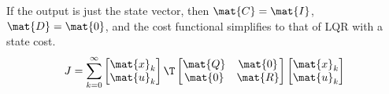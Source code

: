 If the output is just the state vector, then $\mat{C} = \mat{I}$,
$\mat{D} = \mat{0}$, and the cost functional simplifies to that of LQR with a
state cost.
\begin{equation*}
  J = \sum_{k=0}^\infty
  \begin{bmatrix}
    \mat{x}_k \\
    \mat{u}_k
  \end{bmatrix}\T
  \begin{bmatrix}
    \mat{Q} & \mat{0} \\
    \mat{0} & \mat{R}
  \end{bmatrix}
  \begin{bmatrix}
    \mat{x}_k \\
    \mat{u}_k
  \end{bmatrix}
\end{equation*}
